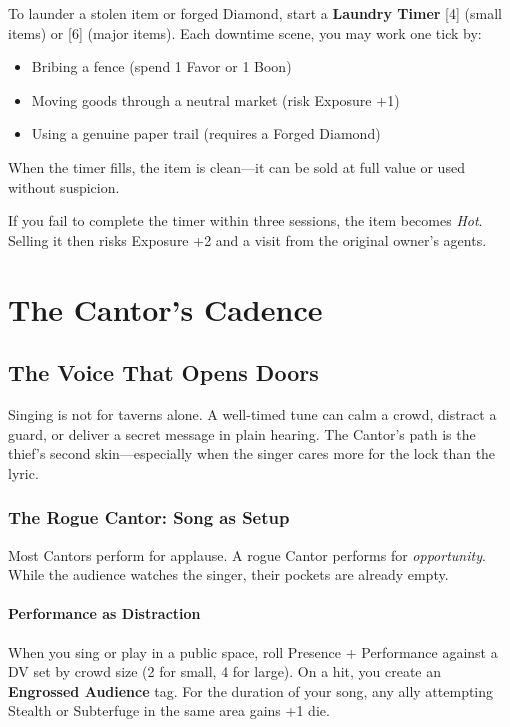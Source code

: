 \documentclass[10pt,twoside]{book}
\begin{document}
To launder a stolen item or forged Diamond, start a \textbf{Laundry Timer } [4] (small items) or [6] (major items). Each downtime scene, you may work one tick by:

\begin{itemize}
\item Bribing a fence (spend 1 Favor or 1 Boon)
\item Moving goods through a neutral market (risk Exposure +1)
\item Using a genuine paper trail (requires a Forged Diamond)
\end{itemize}

When the timer fills, the item is clean---it can be sold at full value or used without suspicion.

If you fail to complete the timer within three sessions, the item becomes \textit{Hot}. Selling it then risks Exposure +2 and a visit from the original owner's agents.

\part{The Cantor's Cadence}

\chapter{The Voice That Opens Doors}

Singing is not for taverns alone. A well-timed tune can calm a crowd, distract a guard, or deliver a secret message in plain hearing. The Cantor's path is the thief's second skin---especially when the singer cares more for the lock than the lyric.

\section{The Rogue Cantor: Song as Setup}

Most Cantors perform for applause. A rogue Cantor performs for \emph{opportunity}. While the audience watches the singer, their pockets are already empty.

\subsection{Performance as Distraction}

When you sing or play in a public space, roll Presence + Performance against a DV set by crowd size (2 for small, 4 for large). On a hit, you create an \textbf{Engrossed Audience} tag. For the duration of your song, any ally attempting Stealth or Subterfuge in the same area gains +1 die.
\end{document}
